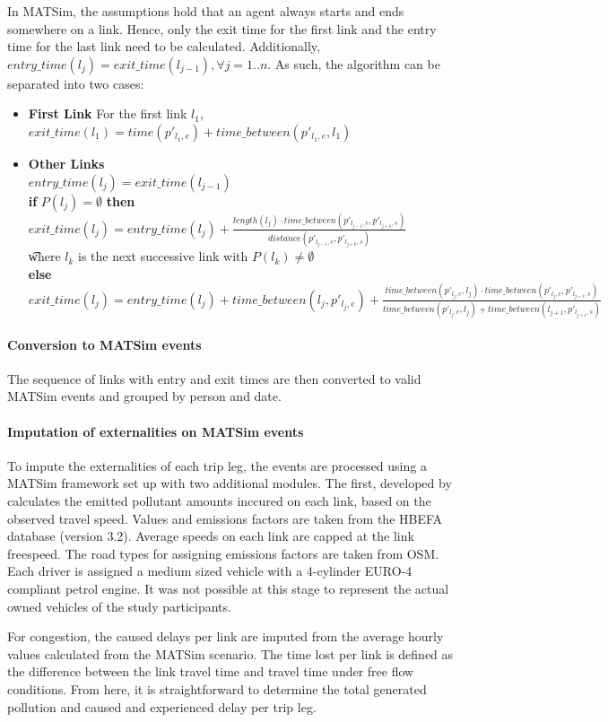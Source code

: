 In MATSim, the assumptions hold that an agent always starts and ends somewhere on a link.
Hence, only the exit time for the first link and the entry time for the last link need to be calculated.
Additionally, $entry\_time(l_{j}) = exit\_time(l_{j-1}),  \forall j = 1..n$.
As such, the algorithm can be separated into two cases:
\begin{itemize}
	\item \textbf{First Link} For the first link $l_1$, $exit\_time(l_1) = time(p'_{l_1,e}) + time\_between(p'_{l_1,e}, l_1)$
	\item \textbf{Other Links} \\
		$entry\_time(l_{j}) = exit\_time(l_{j-1}) $ \\
		\textbf{if} $P(l_j) = \emptyset$ \textbf{then} $exit\_time(l_j) = entry\_time(l_j) + 
										\frac{length(l_j) \cdot time\_between(p'_{l_{j-1},e}, p'_{l_{j+k},s})}{distance(p'_{l_{j-1},e}, p'_{l_{j+k},s})} $ \\
										\t where $l_{k}$ is the next successive link with $P(l_k) \neq \emptyset$  \\
		\textbf{else}  $exit\_time(l_j) = entry\_time(l_j) + time\_between(l_{j}, p'_{l_j,e}) + \frac{time\_between(p'_{l_j,e}, l_{j}) \cdot time\_between(p'_{l_j,e}, p'_{l_{j+1},s})} 
					{time\_between(p'_{l_j,e}, l_{j}) + time\_between(l_{j+1},p'_{l_{j+1},s})}   $ \\
\end{itemize}

\paragraph{Conversion to MATSim events} 
The sequence of links with entry and exit times are then converted to valid MATSim events and grouped by person and date.

\paragraph{Imputation of externalities on MATSim events}
To impute the externalities of each trip leg, the events are processed using a MATSim framework set up with two additional modules.
The first, developed by \citet{kaddoura2017simulation} calculates the emitted pollutant amounts inccured on each link, based on the observed travel speed.
Values and emissions factors are taken from the HBEFA database (version 3.2).
Average speeds on each link are capped at the link freespeed.
The road types for assigning emissions factors are taken from OSM.
Each driver is assigned a medium sized vehicle with a 4-cylinder EURO-4 compliant petrol engine.
It was not possible at this stage to represent the actual owned vehicles of the study participants.

For congestion, the caused delays per link are imputed from the average hourly values calculated from the MATSim scenario.
The time lost per link is defined as the difference between the link travel time and travel time under free flow conditions.
From here, it is straightforward to determine the total generated pollution and caused and experienced delay per trip leg.
